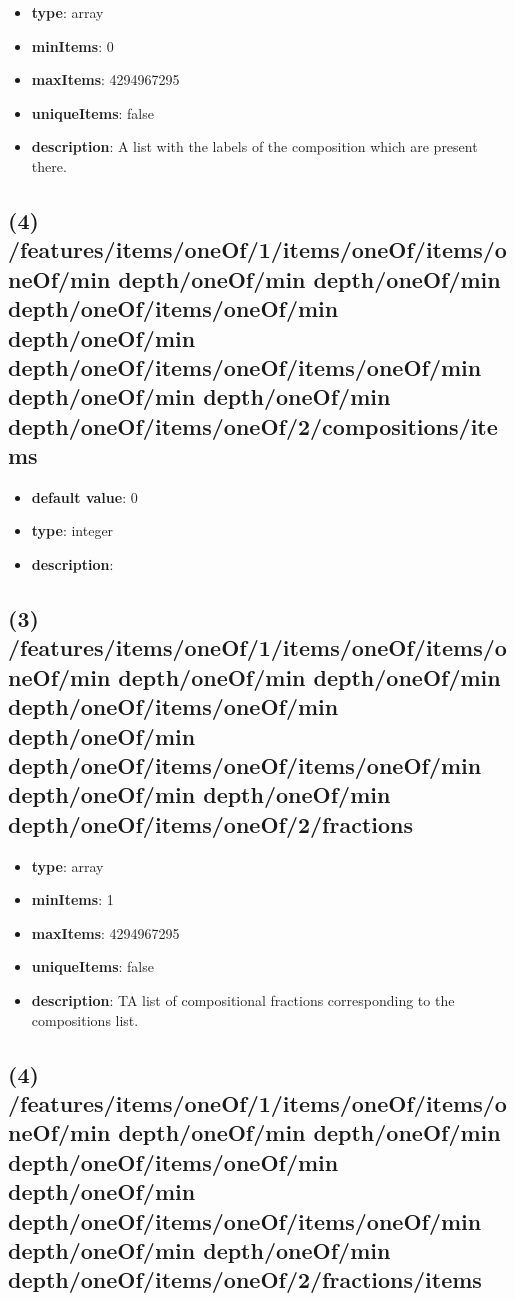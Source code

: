 \begin{itemize}[leftmargin=3em]\item {\bf type}: array
\item {\bf minItems}: 0
\item {\bf maxItems}: 4294967295
\item {\bf uniqueItems}: false
\item {\bf description}: A list with the labels of the composition which are present there.
\end{itemize}\subsection{(4) /features/items/oneOf/1/items/oneOf/items/oneOf/min depth/oneOf/min depth/oneOf/min depth/oneOf/items/oneOf/min depth/oneOf/min depth/oneOf/items/oneOf/items/oneOf/min depth/oneOf/min depth/oneOf/min depth/oneOf/items/oneOf/2/compositions/items}
\begin{itemize}[leftmargin=4em]\item {\bf default value}: 0
\item {\bf type}: integer
\item {\bf description}: 
\end{itemize}\subsection{(3) /features/items/oneOf/1/items/oneOf/items/oneOf/min depth/oneOf/min depth/oneOf/min depth/oneOf/items/oneOf/min depth/oneOf/min depth/oneOf/items/oneOf/items/oneOf/min depth/oneOf/min depth/oneOf/min depth/oneOf/items/oneOf/2/fractions}
\begin{itemize}[leftmargin=3em]\item {\bf type}: array
\item {\bf minItems}: 1
\item {\bf maxItems}: 4294967295
\item {\bf uniqueItems}: false
\item {\bf description}: TA list of compositional fractions corresponding to the compositions list.
\end{itemize}\subsection{(4) /features/items/oneOf/1/items/oneOf/items/oneOf/min depth/oneOf/min depth/oneOf/min depth/oneOf/items/oneOf/min depth/oneOf/min depth/oneOf/items/oneOf/items/oneOf/min depth/oneOf/min depth/oneOf/min depth/oneOf/items/oneOf/2/fractions/items}
